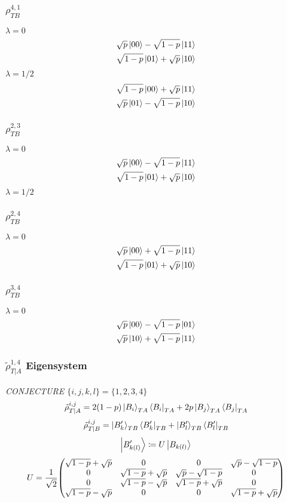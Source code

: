 \documentclass[12pt]{article}
\begin{document}
\subsubsection*{$\rho_{TB}^{4,1}$}
$\lambda = 0$
\begin{align*}
    \sqrt{p}\ket{00} - \sqrt{1-p}\ket{11} \\
    \sqrt{1-p}\ket{01} + \sqrt{p}\ket{10}
\end{align*}
$\lambda = 1/2$
\begin{align*}
    \sqrt{1-p}\ket{00} + \sqrt{p}\ket{11} \\
    \sqrt{p}\ket{01} - \sqrt{1-p}\ket{10}
\end{align*}

\subsubsection*{$\rho_{TB}^{2,3}$}
$\lambda = 0$
\begin{align*}
    \sqrt{p}\ket{00} - \sqrt{1-p}\ket{11} \\
    \sqrt{1-p}\ket{01} + \sqrt{p}\ket{10}
\end{align*}
$\lambda = 1/2$

\subsubsection*{$\rho_{TB}^{2,4}$}
$\lambda = 0$
\begin{align*}
    \sqrt{p}\ket{00} + \sqrt{1-p}\ket{11} \\
    \sqrt{1-p}\ket{01} + \sqrt{p}\ket{10}
\end{align*}

\subsubsection*{$\rho_{TB}^{3,4}$}
$\lambda = 0$
\begin{align*}
    \sqrt{p}\ket{00} - \sqrt{1-p}\ket{01} \\
    \sqrt{p}\ket{10} + \sqrt{1-p}\ket{11}
\end{align*}

\subsubsection*{$\tilde{\rho}_{T|A}^{1,4}$ Eigensystem}
\textit{CONJECTURE $\{i,j,k,l\} = \{1,2,3,4\}$}
\[ \tilde{\rho}_{T|A}^{i,j} = 2(1-p)\ket{B_i}_{TA} \bra{B_i}_{TA} + 2p\ket{B_j}_{TA}\bra{B_j}_{TA} \]
\[ \tilde{\rho}_{T|B}^{i,j} = \ket{B_k'}_{TB} \bra{B_k'}_{TB} + \ket{B_l'}_{TB} \bra{B_l'}_{TB} \]
\[ \ket{B_{k(l)}'} \coloneq U\ket{B_{k(l)}} \]
\[ U = \frac{1}{\sqrt{2}}\mqty(\sqrt{1-p}+\sqrt{p}&0&0&\sqrt{p}-\sqrt{1-p}\\0&\sqrt{1-p}+\sqrt{p}&\sqrt{p}-\sqrt{1-p}&0\\0&\sqrt{1-p}-\sqrt{p}&\sqrt{1-p}+\sqrt{p}&0\\\sqrt{1-p}-\sqrt{p}&0&0&\sqrt{1-p}+\sqrt{p}) \]
\end{document}
